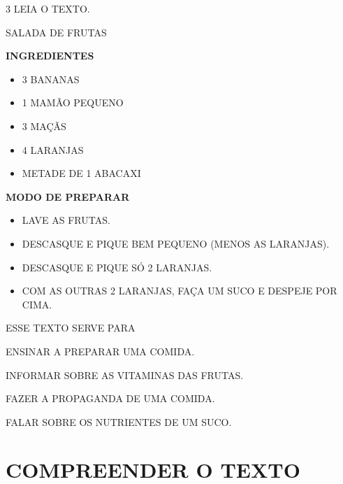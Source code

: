 \pagebreak
\num{3} LEIA O TEXTO.

\begin{myquote}
\Large{SALADA DE FRUTAS}

\vspace{0.5cm}

\normalsize

\textbf{INGREDIENTES}
\begin{itemize}[itemsep=10pt]
\item 3 BANANAS
\item 1 MAMÃO PEQUENO
\item 3 MAÇÃS
\item 4 LARANJAS
\item METADE DE 1 ABACAXI
\end{itemize}


\vspace{0.5cm}

\textbf{MODO DE PREPARAR}
\begin{itemize}[itemsep=10pt]
\item
  LAVE AS FRUTAS.
\item
  DESCASQUE E PIQUE BEM PEQUENO (MENOS AS LARANJAS).
\item
  DESCASQUE E PIQUE SÓ 2 LARANJAS.
\item
  COM AS OUTRAS 2 LARANJAS, FAÇA UM SUCO E DESPEJE POR CIMA.
\end{itemize}
\end{myquote}

ESSE TEXTO SERVE PARA

\begin{escolha}
\item ENSINAR A PREPARAR UMA COMIDA.

\item INFORMAR SOBRE AS VITAMINAS DAS FRUTAS.

\item FAZER A PROPAGANDA DE UMA COMIDA.

\item FALAR SOBRE OS NUTRIENTES DE UM SUCO.
\end{escolha}



\chapter{COMPREENDER O TEXTO}

